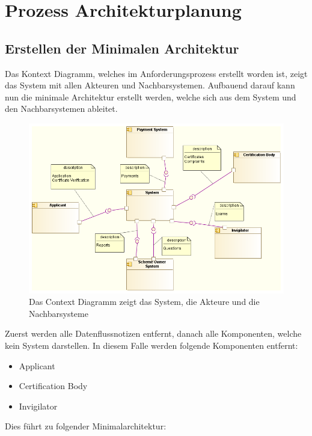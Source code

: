 \chapter{Prozess Architekturplanung}
\section{Erstellen der Minimalen Architektur}
Das Kontext Diagramm, welches im Anforderungsprozess erstellt worden ist, zeigt das System mit allen Akteuren und Nachbarsystemen. Aufbauend darauf kann nun die minimale Architektur erstellt werden, welche sich aus dem System und den Nachbarsystemen ableitet.

\begin{figure}[!htbp]
    \centering
    \includegraphics[scale=0.5]{uml/context.png}
    \caption{Das Context Diagramm zeigt das System, die Akteure und die Nachbarsysteme}
\end{figure}

Zuerst werden alle Datenflussnotizen entfernt, danach alle Komponenten, welche kein System darstellen. In diesem Falle werden folgende Komponenten entfernt:

\begin{itemize}
  \item Applicant
  \item Certification Body
  \item Invigilator
\end{itemize}

Dies führt zu folgender Minimalarchitektur:

